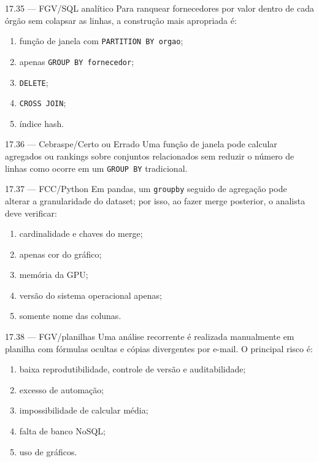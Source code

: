 \begin{questao}{ 17.35 — FGV/SQL analítico}
Para ranquear fornecedores por valor dentro de cada órgão sem colapsar as linhas, a construção mais apropriada é:
\begin{enumerate}[label=\Alph*)]
\item função de janela com \texttt{PARTITION BY orgao};
\item apenas \texttt{GROUP BY fornecedor};
\item \texttt{DELETE};
\item \texttt{CROSS JOIN};
\item índice hash.
\end{enumerate}
\end{questao}

\begin{questao}{ 17.36 — Cebraspe/Certo ou Errado}
Uma função de janela pode calcular agregados ou rankings sobre conjuntos relacionados sem reduzir o número de linhas como ocorre em um \texttt{GROUP BY} tradicional.
\end{questao}

\begin{questao}{ 17.37 — FCC/Python}
Em pandas, um \texttt{groupby} seguido de agregação pode alterar a granularidade do dataset; por isso, ao fazer merge posterior, o analista deve verificar:
\begin{enumerate}[label=\Alph*)]
\item cardinalidade e chaves do merge;
\item apenas cor do gráfico;
\item memória da GPU;
\item versão do sistema operacional apenas;
\item somente nome das colunas.
\end{enumerate}
\end{questao}

\begin{questao}{ 17.38 — FGV/planilhas}
Uma análise recorrente é realizada manualmente em planilha com fórmulas ocultas e cópias divergentes por e-mail. O principal risco é:
\begin{enumerate}[label=\Alph*)]
\item baixa reprodutibilidade, controle de versão e auditabilidade;
\item excesso de automação;
\item impossibilidade de calcular média;
\item falta de banco NoSQL;
\item uso de gráficos.
\end{enumerate}
\end{questao}

